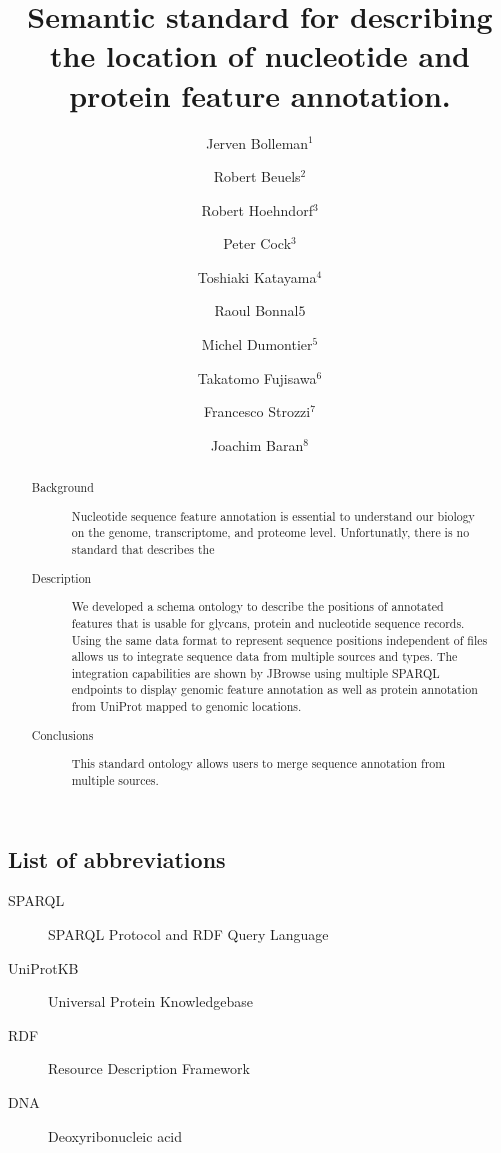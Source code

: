 \documentclass[10pt]{bmc_article}
\newenvironment{bmcformat}{\begin{raggedright}\baselineskip20pt\sloppy\setboolean{publ}{false}}{\end{raggedright}\baselineskip20pt\sloppy}
\begin{document}
\begin{bmcformat}
\title{Semantic standard for describing the location of nucleotide and protein feature annotation.}
\author{Jerven Bolleman\correspondingauthor$^1$  
         \and Robert Beuels$^2$%
         \and Robert Hoehndorf$^3$%
         \and Peter Cock$^3$ %
		 \and Toshiaki Katayama$^4$ %
		 \and Raoul Bonnal$5$ %
		 \and Michel Dumontier$^5$ %
		 \and Takatomo Fujisawa$^6$ %
		 \and Francesco Strozzi$^7$ %
		 \and Joachim Baran$^8$ %
         }
\address{
    \iid(1)SIB Swiss Institute of Bioinformatics, Centre Medical Universitaire, 1 rue Michel
Servet, 1211 Geneva 4, Switzerland,
 \iid(2) fill in,
 \iid(3) fill in,
 \iid(4) fill in,
 \iid(5) INGM,
 \iid(6) fill in,
 \iid(7) fill in, and
 \iid(8) fill in.
        }
\maketitle

\begin{abstract}
\begin{description}
\item[Background] Nucleotide sequence feature annotation is essential to understand our biology on the genome, transcriptome, and proteome level. Unfortunatly, there is no standard that describes the 
\item[Description] We developed a schema ontology to describe the positions of annotated features that is usable for glycans, protein and nucleotide sequence records.
Using the same data format to represent sequence positions independent of files allows us to integrate sequence data from multiple sources and types.
The integration capabilities are shown by JBrowse using multiple SPARQL endpoints to display genomic feature annotation as well as protein annotation from UniProt mapped to genomic locations.
\item[Conclusions] This standard ontology allows users to merge sequence annotation from multiple sources.
\end{description}
\end{abstract}

\section{List of abbreviations}
\begin{description}
\item[SPARQL] SPARQL Protocol and RDF Query Language
\item[UniProtKB] Universal Protein Knowledgebase 
\item[RDF] Resource Description Framework
\item[DNA] Deoxyribonucleic acid
\end{description}
\bigskip


\end{bmcformat}
\end{document}
